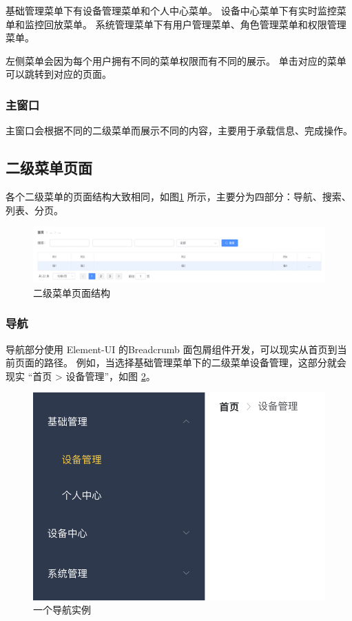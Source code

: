 基础管理菜单下有设备管理菜单和个人中心菜单。
设备中心菜单下有实时监控菜单和监控回放菜单。
系统管理菜单下有用户管理菜单、角色管理菜单和权限管理菜单。

左侧菜单会因为每个用户拥有不同的菜单权限而有不同的展示。
单击对应的菜单可以跳转到对应的页面。

\subsubsection{主窗口}
主窗口会根据不同的二级菜单而展示不同的内容，主要用于承载信息、完成操作。

\subsection{二级菜单页面}
各个二级菜单的页面结构大致相同，如图\ref{Fig:main} 所示，主要分为四部分：导航、搜索、列表、分页。

\begin{figure}[ht]
    \centering
    \includegraphics[width=0.9\linewidth]{./Figure/IMG_main.png}
    \caption{二级菜单页面结构}\label{Fig:main}
\end{figure}

\subsubsection{导航}
导航部分使用 Element-UI 的Breadcrumb 面包屑组件开发，可以现实从首页到当前页面的路径。
例如，当选择基础管理菜单下的二级菜单设备管理，这部分就会现实 “首页 > 设备管理”，如图 \ref{Fig:eg_main}。

\begin{figure}[ht]
    \centering
    \includegraphics[width=0.9\linewidth]{./Figure/IMG_eg_main.png}
    \caption{一个导航实例}\label{Fig:eg_main}
\end{figure}

